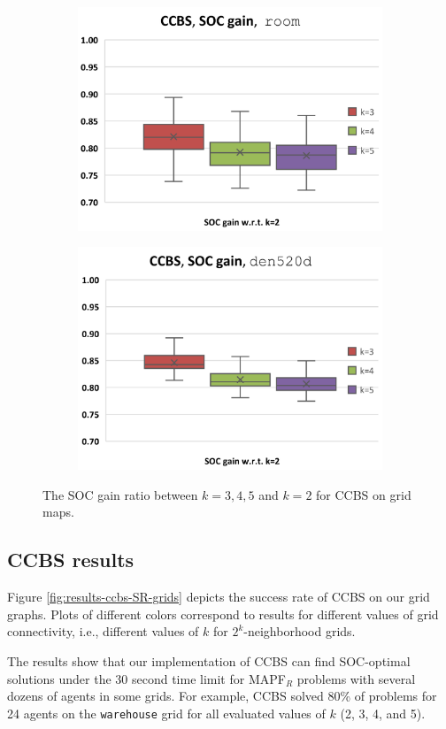 \documentclass[review]{elsarticle}
\newcommand{\ccbs}{\ac{CCBS}\xspace}
\newcommand{\mapfr}{\ac{MAPF}$_R$\xspace}
\begin{document}
\begin{figure}[t]
    \begin{subfigure}
        \centering
        \includegraphics[width=0.45\linewidth]{mapfr-SOC-plot-ccbs-room.pdf}
    \end{subfigure}\hspace{0.025\linewidth}
    \begin{subfigure}
        \centering
        \includegraphics[width=0.45\linewidth]{mapfr-SOC-plot-ccbs-den520d.pdf}
    \end{subfigure}%
    
\caption{The SOC gain ratio between $k=3,4,5$ and $k=2$ for \ccbs on grid maps.}
\label{fig:results-ccbs-SOC-grids}
\end{figure}


\subsection{\ccbs results}

Figure \ref{fig:results-ccbs-SR-grids} depicts the success rate of \ccbs on our grid graphs. Plots of different colors correspond to results for different values of grid connectivity, i.e., different values of $k$ for $2^k$-neighborhood grids. 


The results show that our implementation of \ccbs can find SOC-optimal solutions under the 30 second time limit for \mapfr problems with several dozens of agents in some grids. 
For example, \ccbs solved 80\% of problems for 24 agents on the \texttt{warehouse} grid for all evaluated values of $k$ (2, 3, 4, and 5).
\end{document}

